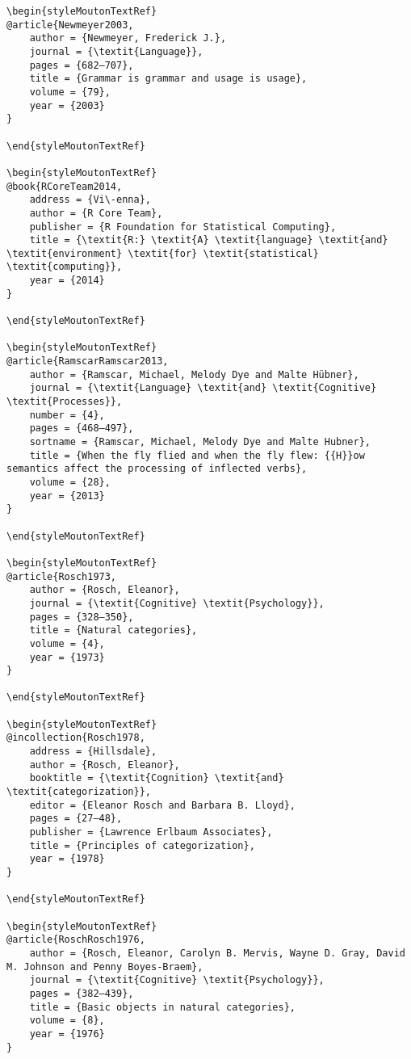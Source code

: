 \begin{styleMoutonHeadingi}
\begin{verbatim}
\begin{styleMoutonTextRef}
@article{Newmeyer2003,
	author = {Newmeyer, Frederick J.},
	journal = {\textit{Language}},
	pages = {682–707},
	title = {Grammar is grammar and usage is usage},
	volume = {79},
	year = {2003}
}

\end{styleMoutonTextRef}

\begin{styleMoutonTextRef}
@book{RCoreTeam2014,
	address = {Vi\-enna},
	author = {R Core Team},
	publisher = {R Foundation for Statistical Computing},
	title = {\textit{R:} \textit{A} \textit{language} \textit{and} \textit{environment} \textit{for} \textit{statistical} \textit{computing}},
	year = {2014}
}

\end{styleMoutonTextRef}

\begin{styleMoutonTextRef}
@article{RamscarRamscar2013,
	author = {Ramscar, Michael, Melody Dye and Malte Hübner},
	journal = {\textit{Language} \textit{and} \textit{Cognitive} \textit{Processes}},
	number = {4},
	pages = {468–497},
	sortname = {Ramscar, Michael, Melody Dye and Malte Hubner},
	title = {When the fly flied and when the fly flew: {{H}}ow semantics affect the processing of inflected verbs},
	volume = {28},
	year = {2013}
}

\end{styleMoutonTextRef}

\begin{styleMoutonTextRef}
@article{Rosch1973,
	author = {Rosch, Eleanor},
	journal = {\textit{Cognitive} \textit{Psychology}},
	pages = {328–350},
	title = {Natural categories},
	volume = {4},
	year = {1973}
}

\end{styleMoutonTextRef}

\begin{styleMoutonTextRef}
@incollection{Rosch1978,
	address = {Hillsdale},
	author = {Rosch, Eleanor},
	booktitle = {\textit{Cognition} \textit{and} \textit{categorization}},
	editor = {Eleanor Rosch and Barbara B. Lloyd},
	pages = {27–48},
	publisher = {Lawrence Erlbaum Associates},
	title = {Principles of categorization},
	year = {1978}
}

\end{styleMoutonTextRef}

\begin{styleMoutonTextRef}
@article{RoschRosch1976,
	author = {Rosch, Eleanor, Carolyn B. Mervis, Wayne D. Gray, David M. Johnson and Penny Boyes-Braem},
	journal = {\textit{Cognitive} \textit{Psychology}},
	pages = {382–439},
	title = {Basic objects in natural categories},
	volume = {8},
	year = {1976}
}


\end{verbatim}
\end{styleMoutonHeadingi}
